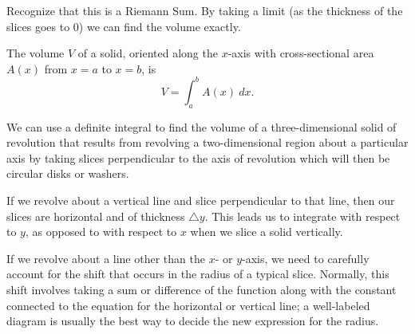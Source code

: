 Recognize that this is a Riemann Sum. By taking a limit (as the thickness of the slices goes to $0$) we can find the volume exactly. 

{The volume $V$ of a solid, oriented along the $x$-axis with cross-sectional area $A(x)$ from $x=a$ to $x=b$, is 
$$V = \int_a^b A(x)\ dx.$$
} %


\begin{summary}
  \item We can use a definite integral to find the volume of a three-dimensional solid of revolution that results from revolving a two-dimensional region about a particular axis by taking slices perpendicular to the axis of revolution which will then be circular disks or washers.
  \item If we revolve about a vertical line and slice perpendicular to that line, then our slices are horizontal and of thickness $\triangle y$. This leads us to integrate with respect to $y$, as opposed to with respect to $x$ when we slice a solid vertically.
  \item If we revolve about a line other than the $x$- or $y$-axis, we need to carefully account for the shift that occurs in the radius of a typical slice.  Normally, this shift involves taking a sum or difference of the function along with the constant connected to the equation for the horizontal or vertical line; a well-labeled diagram is usually the best way to decide the new expression for the radius.
\end{summary}

\clearpage

 

\cleardoublepage